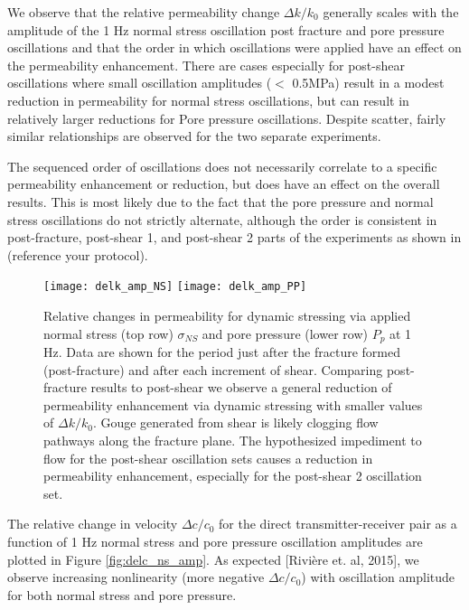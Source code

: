 \documentclass[draft]{agujournal2019}
\begin{document}
We observe that the relative permeability change $ \Delta k/k_0 $ generally scales with the amplitude of the 1 Hz normal stress oscillation post fracture and pore pressure oscillations and that the order in which oscillations were applied have an effect on the permeability enhancement. There are cases especially for post-shear oscillations where small oscillation amplitudes ($< $ 0.5MPa) result in a modest reduction in permeability for normal stress oscillations, but can result in relatively larger reductions for Pore pressure oscillations. Despite scatter, fairly similar relationships are observed for the two separate experiments.

The sequenced order of oscillations does not necessarily correlate to a specific permeability enhancement or reduction, but does have an effect on the overall results. This is most likely due to the fact that the pore pressure and normal stress oscillations do not strictly alternate, although the order is consistent in post-fracture, post-shear 1, and post-shear 2 parts of the experiments as shown in (reference your protocol).



\clearpage

\begin{figure}[ht]
	\centering
	\texttt{[image: delk\_amp\_NS]}
	\texttt{[image: delk\_amp\_PP]}
	\caption{Relative changes in permeability for dynamic stressing via applied normal stress (top row)  $ \sigma_{NS} $ and pore pressure (lower row) $ P_p $ at 1 Hz. Data are shown for the period just after the fracture formed (post-fracture) and after each increment of shear. Comparing post-fracture results to post-shear we observe a general reduction of permeability enhancement via dynamic stressing with smaller values of $ \Delta k/k_0 $. Gouge generated from shear is likely clogging flow pathways along the fracture plane. The hypothesized impediment to flow for the post-shear oscillation sets causes a reduction in permeability enhancement, especially for the post-shear 2 oscillation set.}
	\label{fig:perm_ns_amp}
\end{figure}

\clearpage


The relative change in velocity $ \Delta c/c_0 $ for the direct transmitter-receiver pair as a function of 1 Hz normal stress and pore pressure oscillation amplitudes are plotted in Figure \ref{fig:delc_ns_amp}. As expected [Rivière et. al, 2015], we observe increasing nonlinearity (more negative $ \Delta c/c_0 $) with oscillation amplitude for both normal stress and pore pressure. 
\end{document}
